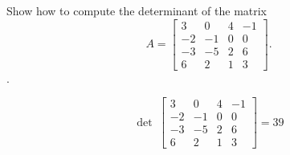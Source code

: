 
\begin{exerciseStatement}


Show how to compute the determinant of the matrix \[A= \left[\begin{array}{cccc}
3 & 0 & 4 & -1 \\
-2 & -1 & 0 & 0 \\
-3 & -5 & 2 & 6 \\
6 & 2 & 1 & 3
\end{array}\right] .\].


\end{exerciseStatement}
    
\begin{exerciseAnswer} 
\[\operatorname{det}\  \left[\begin{array}{cccc}
3 & 0 & 4 & -1 \\
-2 & -1 & 0 & 0 \\
-3 & -5 & 2 & 6 \\
6 & 2 & 1 & 3
\end{array}\right] = 39 \]
\end{exerciseAnswer}
    
